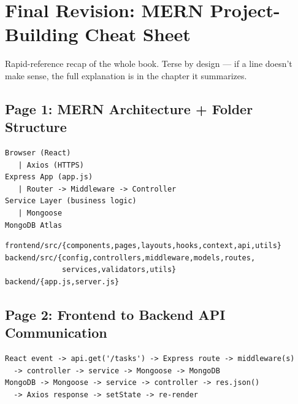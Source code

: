 \chapter*{Final Revision: MERN Project-Building Cheat Sheet}

\begin{notebox}[NOTE]
Rapid-reference recap of the whole book. Terse by design --- if a line
doesn't make sense, the full explanation is in the chapter it summarizes.
\end{notebox}

\section*{Page 1: MERN Architecture + Folder Structure}

\begin{diagrambox}
\begin{verbatim}
Browser (React)
   | Axios (HTTPS)
Express App (app.js)
   | Router -> Middleware -> Controller
Service Layer (business logic)
   | Mongoose
MongoDB Atlas
\end{verbatim}
\end{diagrambox}

\begin{diagrambox}
\begin{verbatim}
frontend/src/{components,pages,layouts,hooks,context,api,utils}
backend/src/{config,controllers,middleware,models,routes,
             services,validators,utils}
backend/{app.js,server.js}
\end{verbatim}
\end{diagrambox}

\newpage
\section*{Page 2: Frontend to Backend API Communication}

\begin{diagrambox}
\begin{verbatim}
React event -> api.get('/tasks') -> Express route -> middleware(s)
  -> controller -> service -> Mongoose -> MongoDB
MongoDB -> Mongoose -> service -> controller -> res.json()
  -> Axios response -> setState -> re-render
\end{verbatim}
\end{diagrambox}

